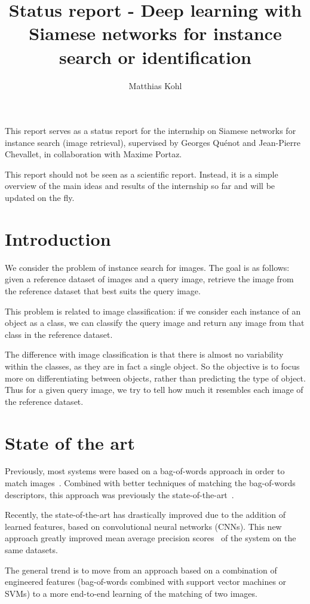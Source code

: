 \documentclass[fleqn]{article}
\title{Status report - Deep learning with Siamese networks for instance search or identification}
\author{Matthias Kohl}
\begin{document}
\maketitle

This report serves as a status report for the internship on
Siamese networks for instance search (image retrieval),
supervised by Georges Quénot and Jean-Pierre Chevallet,
in collaboration with Maxime Portaz.

This report should not be seen as a scientific report.
Instead, it is a simple overview of the main ideas and
results of the internship so far and will be updated on the fly.

\section{Introduction}
We consider the problem of instance search for images.
The goal is as follows:
given a reference dataset of images and a query image,
retrieve the image from the reference dataset that
best suits the query image.

This problem is related to image classification:
if we consider each instance of an object as a class,
we can classify the query image and return any image
from that class in the reference dataset.

The difference with image classification is that
there is almost no variability within the classes,
as they are in fact a single object.
So the objective is to focus more on differentiating between objects,
rather than predicting the type of object.
Thus for a given query image, we try to tell how much it resembles each
image of the reference dataset.

\section{State of the art}
Previously, most systems were based on a bag-of-words approach
in order to match images~\cite{philbin_object_2007}.
Combined with better techniques of matching the bag-of-words descriptors,
this approach was previously the state-of-the-art~\cite{mikulik_learning_2013}.

Recently, the state-of-the-art has drastically improved due to the
addition of learned features, based on convolutional neural networks
(CNNs).
This new approach greatly improved
mean average precision scores~\cite{gordo_deep_2016} of the system
on the same datasets.

The general trend is to move from an approach based on a combination of
engineered features (bag-of-words combined with
support vector machines or SVMs) to a more end-to-end learning of
the matching of two images.
\end{document}
